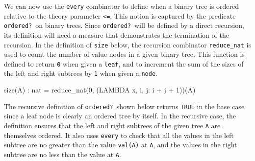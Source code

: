 \documentclass[11pt,twoside]{book}
\begin{document}
We can now use the \texttt{every} combinator to define when 
a binary tree is ordered relative to the theory parameter \texttt{<=}\@.
This notion is captured by the predicate \texttt{ordered?}\ on binary trees.
Since \texttt{ordered?}\ will be defined by a direct recursion, its definition
will need a measure that demonstrates the termination of the recursion.
In the definition of \texttt{size} below, the recursion combinator \texttt{reduce\_nat} is used to count the number of value nodes in a
given binary tree.  This function is defined to return \texttt{0} when
given a \texttt{leaf}, and to increment the sum of the sizes of the left
and right subtrees by \texttt{1} when given a \texttt{node}\@.  
\begin{session*}\label{size}
size(A) : nat =
  reduce_nat(0, (LAMBDA x, i, j: i + j + 1))(A)
\end{session*}

The recursive definition of \texttt{ordered?}\ shown below returns \texttt{TRUE} in the base case since a leaf node is clearly an ordered tree by
itself.  In the recursive case, the definition ensures that the left
and right subtrees of the given tree \texttt{A} are themselves ordered.  
It also uses \texttt{every} to check that all the values in the left
subtree are no greater than the value \texttt{val(A)} at \texttt{A}, and the
values in the right subtree are no less than the value at \texttt{A}\@.
\end{document}
